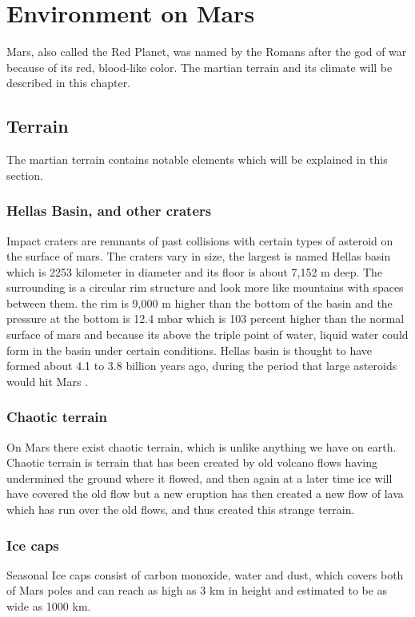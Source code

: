 \chapter{Environment on Mars}\label{ch:environmentOnMars}

Mars, also called the Red Planet, was named by the Romans after the god of war because of its red, blood-like color. The martian terrain and its climate will be described in this chapter.

\section{Terrain} 
The martian terrain contains notable elements which will be explained in this section.

\subsection{Hellas Basin, and other craters}
Impact craters are remnants of past collisions with certain types of asteroid on the surface of mars. The craters vary in size, the largest is named Hellas basin which is 2253 kilometer in diameter and its floor is about 7,152 m  deep. The surrounding is a circular rim structure and look more like mountains with spaces between them.
the rim is 9,000 m higher than the bottom of the basin and the pressure at the bottom is 12.4  mbar which is  103 percent higher than the normal surface of mars  and because its above the triple point of water, liquid water could form in the basin under certain conditions. Hellas basin is thought to have formed about 4.1 to 3.8 billion years ago, during the period that large asteroids would hit Mars \cite{hellas}.

\subsection{Chaotic terrain}\label{ch:chaoticT}
On Mars there exist chaotic terrain, which is unlike anything we have on earth.\\
Chaotic terrain is terrain that has been created by old volcano flows having undermined the ground where it flowed, and then again at a later time ice will have covered the old flow but a new eruption has then created a new flow of lava which has run over the old flows, and thus created this strange terrain\cite{CTerrain}.

\subsection{Ice caps}
Seasonal Ice caps consist of carbon monoxide, water and dust, which covers both of Mars poles and can reach as high as 3 km in height and estimated to be as wide as 1000 km.

